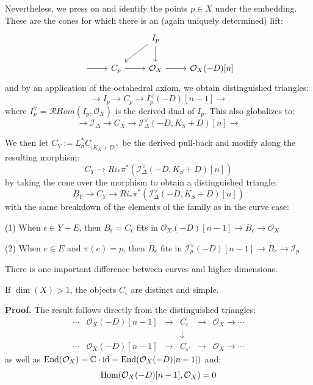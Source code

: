 \documentclass{amsart}
\begin{document}
Nevertheless, we press on and identify the points $p\in X$ under the embedding. These are the cones for which 
there is an (again uniquely determined) lift: 
\[ \begin{tikzcd}
    && I_p \arrow[ld] \arrow[d] \\
    \arrow[r] & C_p \arrow[r] & {\mathcal O}_X \arrow[r] & {\mathcal O}_X(-D)[n] 
\end{tikzcd} \] 
and by an application of the octahedral axiom, we obtain distinguished triangles:  
\[ \rightarrow I_p \rightarrow C_p \rightarrow I_p^\vee (-D) [n-1] \rightarrow \] 
where 
$I_p^\vee = {\mathcal RHom}(I_p, {\mathcal O}_X)$
is the derived dual of $I_p$. This also globalizes  to: 
\[ \rightarrow {\mathcal I}_\Delta \rightarrow C_X \rightarrow {\mathcal I}^\vee_\Delta(-D,K_S + D) [n]  \rightarrow  \] 

We then let
$C_Y := L_\sigma^* C_{|K_X + D|^\vee}$ be the derived pull-back
and modify along the resulting morphism: 
\[ C_Y \rightarrow Ri_*\pi^* \left({\mathcal I}^\vee_\Delta(-D,K_S + D) [n]\right)  \] 
by taking the cone over the morphism to obtain a distinguished triangle: 
\[ B_Y \rightarrow C_Y \rightarrow Ri_*\pi^* \left({\mathcal I}^\vee_\Delta(-D,K_S + D) [n]\right) \] 
with the same breakdown of the elements of the family as in the curve case:

\medskip

(1) When $\epsilon \in Y - E$, then $B_\epsilon = C_\epsilon$ fits in 
${\mathcal O}_X(-D)[n-1] \rightarrow B_\epsilon \rightarrow {\mathcal O}_X$

\medskip

(2) When $e \in E$ and $\pi(e) = p$, then $B_e$ fits in 
${\mathcal I}_p^\vee(-D)[n-1] \rightarrow B_e \rightarrow {\mathcal I}_p $ 

\medskip

There is one important difference between curves and higher dimensions. 

\medskip

 If $\dim(X) > 1$, the objects $C_\epsilon$ are distinct and simple. 

\medskip

{\bf Proof.} The result follows directly from the distinguished triangles: 
\[ \begin{array}{cccccccccc} \cdots & {\mathcal O}_X(-D)[n-1] & \rightarrow & C_\epsilon & \rightarrow & {\mathcal O}_X \rightarrow \cdots \\
&&& \downarrow \\
\cdots & {\mathcal O}_X(-D)[n-1] & \rightarrow & C_{\epsilon'} & \rightarrow & {\mathcal O}_X \rightarrow \cdots 
\end{array} \] 
as well as  $\mbox{End}({\mathcal O}_X) =  {\mathbb C} \cdot \mbox{id} = \mbox{End}({\mathcal O}_X(-D)[n-1])$  and: 
\[ \mbox{Hom}({\mathcal O}_X(-D)[n-1], {\mathcal O}_X) = 0  \] 
\end{document}
